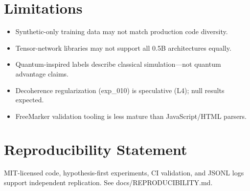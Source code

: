\section{Limitations}

\begin{itemize}
  \item Synthetic-only training data may not match production code diversity.
  \item Tensor-network libraries may not support all 0.5B architectures equally.
  \item Quantum-inspired labels describe classical simulation---not quantum advantage claims.
  \item Decoherence regularization (exp\_010) is speculative (L4); null results expected.
  \item FreeMarker validation tooling is less mature than JavaScript/HTML parsers.
\end{itemize}

\section*{Reproducibility Statement}
MIT-licensed code, hypothesis-first experiments, CI validation, and JSONL logs support independent replication. See docs/REPRODUCIBILITY.md.

